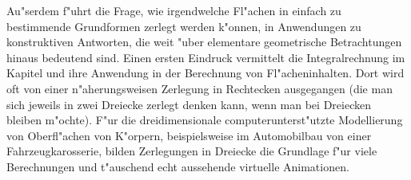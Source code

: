 \begin{MIntro}
Au"serdem f"uhrt die Frage, wie irgendwelche Fl"achen in einfach zu 
bestimmende {\glqq}Grundformen{\grqq} zerlegt werden k"onnen, in Anwendungen 
zu konstruktiven Antworten, die weit "uber elementare geometrische 
Betrachtungen hinaus bedeutend sind. 
Einen ersten Eindruck vermittelt die Integralrechnung im Kapitel 
 und ihre Anwendung in der Berechnung von Fl"acheninhalten. 
Dort wird oft von einer {\glqq}n"aherungsweisen{\grqq} Zerlegung in Rechtecken 
ausgegangen (die man sich jeweils in zwei Dreiecke zerlegt denken kann, wenn 
man bei Dreiecken bleiben m"ochte). 
F"ur die dreidimensionale computerunterst"utzte Modellierung 
von Oberfl"achen von K"orpern, beispielsweise im Automobilbau von einer 
Fahrzeugkarosserie, bilden Zerlegungen in Dreiecke die Grundlage f"ur viele 
Berechnungen und t"auschend echt aussehende virtuelle Animationen.  
\end{MIntro}


